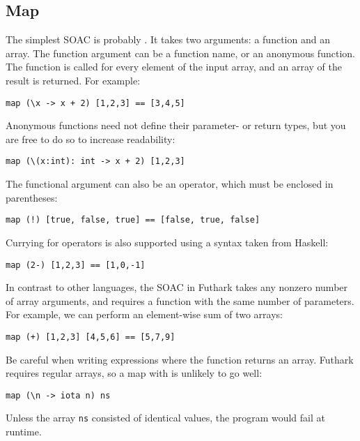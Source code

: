 \documentclass[oneside,11pt]{book}
\begin{document}
\subsection{Map}

The simplest SOAC is probably .  It takes two arguments: a
function and an array.  The function argument can be a function name,
or an anonymous function.  The function is
called for every element of the input array, and an array of the result is
returned.  For example:

\begin{lstlisting}
map (\x -> x + 2) [1,2,3] == [3,4,5]
\end{lstlisting}

Anonymous functions need not define their parameter- or return types,
but you are free to do so to increase readability:

\begin{lstlisting}
map (\(x:int): int -> x + 2) [1,2,3]
\end{lstlisting}

The functional argument can also be an operator, which must be
enclosed in parentheses:

\begin{lstlisting}
map (!) [true, false, true] == [false, true, false]
\end{lstlisting}

Currying for operators is also supported using a syntax taken from
Haskell:

\begin{lstlisting}
map (2-) [1,2,3] == [1,0,-1]
\end{lstlisting}

In contrast to other languages, the  SOAC in Futhark takes any
nonzero number of array arguments, and requires a function with the
same number of parameters.  For example, we can perform an
element-wise sum of two arrays:

\begin{lstlisting}
map (+) [1,2,3] [4,5,6] == [5,7,9]
\end{lstlisting}

Be careful when writing  expressions where the function
returns an array.  Futhark requires regular arrays, so a map with
 is unlikely to go well:

\begin{lstlisting}
map (\n -> iota n) ns
\end{lstlisting}

Unless the array \texttt{ns} consisted of identical values, the
program would fail at runtime.
\end{document}
